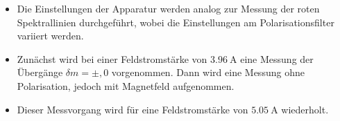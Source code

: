 \begin{enumerate}
    \begin{itemize}
        \item Die Einstellungen der Apparatur werden analog zur Messung der roten 
        Spektrallinien durchgeführt, wobei die Einstellungen am Polarisationsfilter variiert werden.
        \item Zunächst wird bei einer Feldstromstärke von $\SI{3,96}{\ampere}$ eine Messung der Übergänge
        $\delta m= \pm,0$ vorgenommen. Dann wird eine Messung ohne Polarisation, jedoch mit Magnetfeld 
        aufgenommen.
        \item Dieser Messvorgang wird für eine Feldstromstärke von $\SI{5,05}{\ampere}$ wiederholt.
    \end{itemize}
\end{enumerate}
